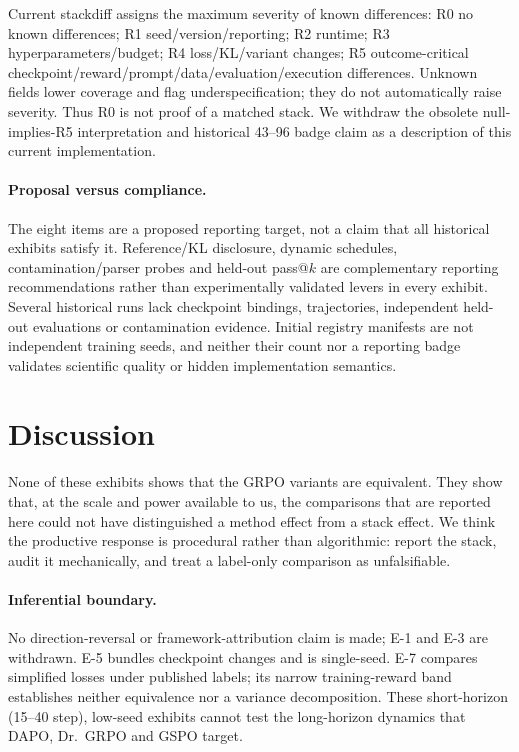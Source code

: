 Current stackdiff assigns the maximum severity of known differences:
R0 no known differences; R1 seed/version/reporting; R2 runtime;
R3 hyperparameters/budget; R4 loss/KL/variant changes; R5 outcome-critical
checkpoint/reward/prompt/data/evaluation/execution differences. Unknown
fields lower coverage and flag underspecification; they do not automatically
raise severity. Thus R0 is not proof of a matched stack. We withdraw the
obsolete null-implies-R5 interpretation and historical 43--96 badge claim
as a description of this current implementation.

\paragraph{Proposal versus compliance.} The eight items are a proposed reporting target, not a claim that all historical exhibits satisfy it. Reference/KL disclosure, dynamic schedules, contamination/parser probes and held-out pass@$k$ are complementary reporting recommendations rather than experimentally validated levers in every exhibit. Several historical runs lack checkpoint bindings, trajectories, independent held-out evaluations or contamination evidence. Initial registry manifests are not independent training seeds, and neither their count nor a reporting badge validates scientific quality or hidden implementation semantics.

\section{Discussion}

None of these exhibits shows that the GRPO variants are equivalent. They show
that, at the scale and power available to us, the comparisons that are
reported here could not have distinguished a method effect from a stack
effect. We think the productive response is procedural rather than
algorithmic: report the stack, audit it mechanically, and treat a label-only
comparison as unfalsifiable.

\paragraph{Inferential boundary.} No direction-reversal or framework-attribution claim is made; E-1 and E-3 are withdrawn. E-5 bundles checkpoint changes and is single-seed. E-7 compares simplified losses under published labels; its narrow training-reward band establishes neither equivalence nor a variance decomposition. These short-horizon (15--40 step), low-seed exhibits cannot test the long-horizon dynamics that DAPO, Dr.\ GRPO and GSPO target.

